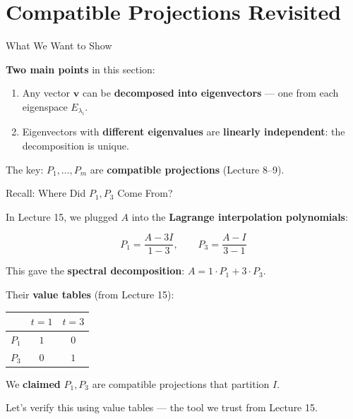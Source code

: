 \documentclass[10pt]{beamer}
\theoremstyle{definition}
\newcommand{\x}[1]{\alert{\textbf{#1}}}
\begin{document}
\section{Compatible Projections Revisited}


\begin{frame}{What We Want to Show}

\vfill

\x{Two main points} in this section:

\vfill

\begin{enumerate}
\item Any vector $\mathbf{v}$ can be \x{decomposed into eigenvectors} --- one from each eigenspace $E_{\lambda_i}$.

\vspace{0.3cm}

\item Eigenvectors with \x{different eigenvalues} are \x{linearly independent}: the decomposition is unique.
\end{enumerate}

\vfill

The key: $P_1, \ldots, P_m$ are \x{compatible projections} (Lecture 8--9).

\vfill

\end{frame}


\begin{frame}[shrink=5]{Recall: Where Did $P_1, P_3$ Come From?}

In Lecture 15, we plugged $A$ into the \x{Lagrange interpolation polynomials}:

$$P_1 = \frac{A - 3I}{1 - 3}, \qquad P_3 = \frac{A - I}{3 - 1}$$

This gave the \x{spectral decomposition}: $A = 1 \cdot P_1 + 3 \cdot P_3$.

\vfill

Their \x{value tables} (from Lecture 15):

\begin{center}
\renewcommand{\arraystretch}{1.3}
\begin{tabular}{c|cc}
 & $t = 1$ & $t = 3$ \\
\hline
$P_1$ & $1$ & $0$ \\
$P_3$ & $0$ & $1$
\end{tabular}
\end{center}

\vfill\pause

We \x{claimed} $P_1, P_3$ are compatible projections that partition $I$.

\vfill

Let's verify this using value tables --- the tool we trust from Lecture 15.

\end{frame}
\end{document}
